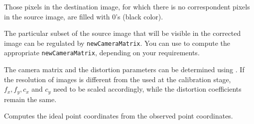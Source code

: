 Those pixels in the destination image, for which there is no correspondent pixels in the source image, are filled with 0's (black color).

The particular subset of the source image that will be visible in the corrected image can be regulated by \texttt{newCameraMatrix}. You can use  to compute the appropriate \texttt{newCameraMatrix}, depending on your requirements.

The camera matrix and the distortion parameters can be determined using
. If the resolution of images is different from the used at the calibration stage, $f_x, f_y, c_x$ and $c_y$ need to be scaled accordingly, while the distortion coefficients remain the same.


\ifCPy
{}
\else
{}
\fi
Computes the ideal point coordinates from the observed point coordinates.



